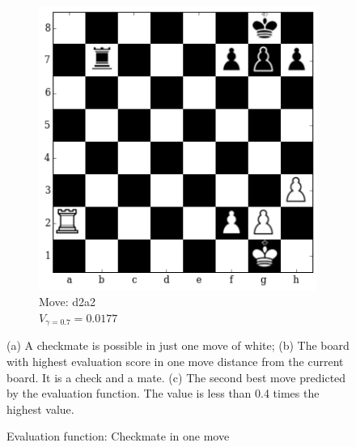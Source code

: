 \begin{figure}[H]
\begin{subfigure}[t]{0.45\textwidth}
    \includegraphics[width=\textwidth]{img/table_evaluations/output_12_4.png}
        \caption{Move: d2a2\\
        $V_{\gamma=0.7}=0.0177$}
    \end{subfigure}
    \caption{Evaluation function: Checkmate in one move}
    \small
    \justifying
    (a) A checkmate is possible in just one move of white; (b) The board with 
highest evaluation score in one move distance from the current board. It is a 
check and a mate. (c) The second best move predicted by the evaluation 
function. The value is less than 0.4 times the highest value.
\label{figure:eval:checkmate}
\end{figure}

